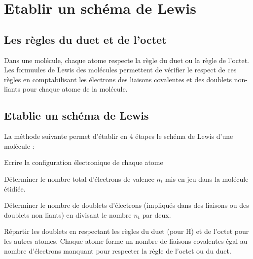 \documentclass[a4paper,11pt,fleqn]{scrartcl}
\begin{document}
    \maketitle
\section{Etablir un schéma de Lewis}
    \subsection{Les règles du duet et de l'octet}
    Dans une molécule, chaque atome respecte la règle du duet ou la règle de l'octet. Les formuules de Lewis des molécules permettent de vérifier le respect de ces règles en comptabilisant les électrons des liaisons covalentes et des doublets non-liants pour chaque atome de la molécule.
    \subsection{Etablie un schéma de Lewis}
    La méthode suivante permet d'établir en 4 étapes le schéma de Lewis d'une molécule :
    \begin{cours}
    \begin{itemize*}
        \item Ecrire la configuration électronique de chaque atome
        \item Déterminer le nombre total d'électrons de valence $n_t$ mis en jeu dans la molécule étidiée.
        \item Déterminer le nombre de doublets d'électrons (impliqués dans des liaisons ou des doublets non liants) en divisant le nombre $n_t$ par deux.
        \item Répartir les doublets en respectant les règles du duet (pour H) et de l'octet pour les autres atomes. Chaque atome forme un nombre de liaisons covalentes égal au nombre d'électrons manquant pour respecter la règle de l'octet ou du duet.
    \end{itemize*}
    \end{cours}
\end{document}
